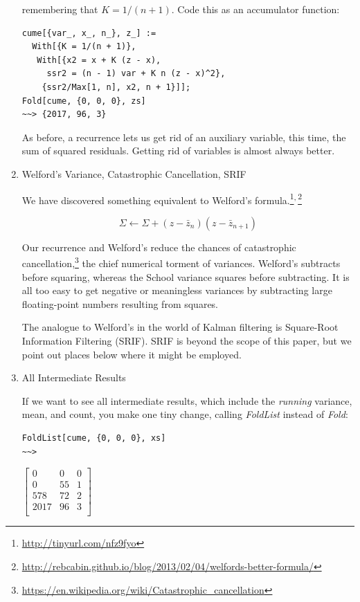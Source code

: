 \documentclass[10pt,oneside,x11names]{article}
\begin{document}
\begin{enumerate}
\noindent remembering that \(K=1/(n+1)\).  Code this as an accumulator function:

\begin{verbatim}
cume[{var_, x_, n_}, z_] :=
  With[{K = 1/(n + 1)},
   With[{x2 = x + K (z - x),
     ssr2 = (n - 1) var + K n (z - x)^2},
    {ssr2/Max[1, n], x2, n + 1}]];
Fold[cume, {0, 0, 0}, zs]
~~> {2017, 96, 3}
\end{verbatim}

As before, a recurrence lets us get rid of an auxiliary variable, this time, the
sum of squared residuals. Getting rid of variables is almost always better.

\item Welford's Variance, Catastrophic Cancellation, SRIF
\label{sec:orgheadline9}

We have discovered something equivalent to Welford's 
formula.\footnote{\url{http://tinyurl.com/nfz9fyo}}\textsuperscript{,}\,\footnote{\url{http://rebcabin.github.io/blog/2013/02/04/welfords-better-formula/}}

\begin{equation*}
\Sigma \leftarrow \Sigma + (z-\bar{z}_n)(z-\bar{z}_{n+1})
\end{equation*}

Our recurrence and Welford's reduce the chances of catastrophic
cancellation,\footnote{\url{https://en.wikipedia.org/wiki/Catastrophic_cancellation}} the chief numerical torment of variances. Welford's
subtracts before squaring, whereas the School variance squares before
subtracting. It is all too easy to get negative or meaningless variances by
subtracting large floating-point numbers resulting from squares.

The analogue to Welford's in the world of Kalman filtering is Square-Root
Information Filtering (SRIF).\footnotemark[4]{} SRIF is beyond the scope of this paper,
but we point out places below where it might be employed.

\item All Intermediate Results
\label{sec:orgheadline10}

If we want to see all intermediate results, which include the \emph{running}
variance, mean, and count, you make one tiny change, calling
\emph{FoldList} instead of \emph{Fold}:

\begin{verbatim}
FoldList[cume, {0, 0, 0}, xs]
~~>
\end{verbatim}
$\begin{bmatrix}
 0 & 0 & 0 \\
 0 & 55 & 1 \\
 578 & 72 & 2 \\
 2017 & 96 & 3 \\
\end{bmatrix}$


\end{enumerate}
\end{document}
